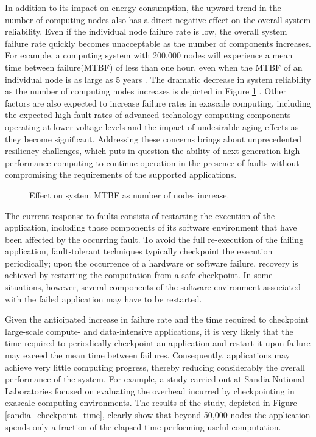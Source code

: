 In addition to its impact on energy consumption, the upward trend in
the number of computing nodes also has a direct negative effect on the
overall system reliability. Even if the individual node failure rate
is low, the overall system failure rate quickly becomes unacceptable
as the number of components increases. For example, a computing system
with 200,000 nodes will experience a mean time between failure(MTBF)
of less than one hour, even when the MTBF of an individual node is as
large as 5 years \cite{riesen_sandia_2010}. The dramatic decrease in
system reliability as the number of computing nodes increases is
depicted in Figure \ref{sandia_system_mtbf}
\cite{riesen_sandia_2010}. Other factors are also expected to increase
failure rates in exascale computing, including the expected high fault rates of
advanced-technology computing components operating at lower voltage
levels and the impact of undesirable aging effects as they become
significant\cite{srinivasan_dsn_2004}. Addressing these concerns
brings about unprecedented resiliency challenges, which puts in
question the ability of next generation high performance computing to
continue operation in the presence of faults without compromising the
requirements of the supported applications.

\begin{figure}[hHtb]
\centering
{}
\caption { Effect on system MTBF as number of nodes increase. }
\label{sandia_system_mtbf}
\end{figure}

The current response to faults consists of restarting the execution of
the application, including those components of its software
environment that have been affected by the occurring fault. To avoid
the full re-execution of the failing application, fault-tolerant
techniques typically checkpoint the execution periodically; upon the
occurrence of a hardware or software failure, recovery is achieved by
restarting the computation from a safe checkpoint. In some situations,
however, several components of the software environment associated
with the failed application may have to be restarted.

Given the anticipated increase in failure rate and the time required
to checkpoint large-scale compute- and data-intensive applications, it
is very likely that the time required to periodically checkpoint an
application and restart it upon failure may exceed the mean time
between failures.  Consequently, applications may achieve very little
computing progress, thereby reducing considerably the overall
performance of the system.  For example, a study carried out at Sandia
National Laboratories focused on evaluating the overhead incurred by
checkpointing in exascale computing environments. The results of the
study, depicted in Figure \ref{sandia_checkpoint_time}, clearly show
that beyond 50,000 nodes the application spends only a fraction of the
elapsed time performing useful computation.

